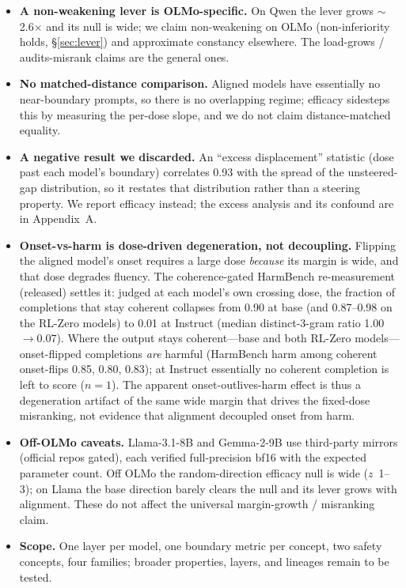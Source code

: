 \documentclass{article}
\newcommand{\x}{$\times$}
\begin{document}
\begin{itemize}\itemsep2pt
\item \textbf{A non-weakening lever is OLMo-specific.} On Qwen the lever grows $\sim$\num{2.6}\x{}
  and its null is wide; we claim non-weakening on OLMo (non-inferiority holds, \S\ref{sec:lever}) and approximate constancy elsewhere. The
  load-grows / audits-misrank claims are the general ones.
\item \textbf{No matched-distance comparison.} Aligned models have essentially no near-boundary
  prompts, so there is no overlapping regime; efficacy sidesteps this by measuring the per-dose
  slope, and we do not claim distance-matched equality.
\item \textbf{A negative result we discarded.} An ``excess displacement'' statistic (dose past each
  model's boundary) correlates \num{0.93} with the spread of the unsteered-gap distribution, so it
  restates that distribution rather than a steering property. We report efficacy instead; the excess
  analysis and its confound are in Appendix~A.
\item \textbf{Onset-vs-harm is dose-driven degeneration, not decoupling.} Flipping the aligned
  model's onset requires a large dose \emph{because} its margin is wide, and that dose degrades
  fluency. The coherence-gated HarmBench re-measurement (released) settles it: judged at each model's
  own crossing dose, the fraction of completions that stay coherent collapses from \num{0.90} at base
  (and \num{0.87}--\num{0.98} on the RL-Zero models) to \num{0.01} at Instruct (median distinct-3-gram
  ratio \num{1.00}$\rightarrow$\num{0.07}). Where the output stays coherent---base and both RL-Zero
  models---onset-flipped completions \emph{are} harmful (HarmBench harm among coherent onset-flips
  \num{0.85}, \num{0.80}, \num{0.83}); at Instruct essentially no coherent completion is left to score
  ($n{=}1$). The apparent onset-outlives-harm effect is thus a degeneration artifact of the same wide
  margin that drives the fixed-dose misranking, not evidence that alignment decoupled onset from harm.
\item \textbf{Off-OLMo caveats.} Llama-3.1-8B and Gemma-2-9B use third-party mirrors (official repos
  gated), each verified full-precision bf16 with the expected parameter count. Off OLMo the
  random-direction efficacy null is wide ($z$~1--3); on Llama the base direction barely clears the
  null and its lever grows with alignment. These do not affect the universal margin-growth /
  misranking claim.
\item \textbf{Scope.} One layer per model, one boundary metric per concept, two safety concepts,
  four families; broader properties, layers, and lineages remain to be tested.
\end{itemize}
\end{document}
